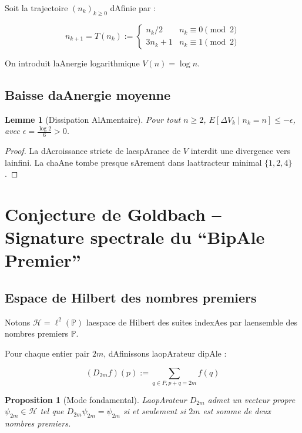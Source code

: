 ﻿\documentclass[12pt]{article}
\newtheorem{lemma}{Lemme}
\newtheorem{proposition}{Proposition}
\begin{document}
Soit la trajectoire $(n_k)_{k\ge 0}$ dAfinie par :

$$n_{k+1} = T(n_k) := \begin{cases} n_k/2 & n_k \equiv 0 \pmod 2 \\ 3n_k+1 & n_k \equiv 1 \pmod 2 \end{cases}$$



On introduit laAnergie logarithmique $V(n) = \log n$.



\subsection{Baisse daAnergie moyenne} 

\begin{lemma}[Dissipation AlAmentaire] 

Pour tout $n\ge 2$, $E[\Delta V_k \mid n_k = n] \le -\epsilon$, avec $\epsilon = \frac{\log 2}{6} > 0$.

\end{lemma}



\begin{proof}

La dAcroissance stricte de laespArance de $V$ interdit une divergence vers lainfini. La chaAne tombe presque sArement dans laattracteur minimal $\{1,2,4\}$.

\end{proof}



\section{Conjecture de Goldbach -- Signature spectrale du ``BipAle Premier''}



\subsection{Espace de Hilbert des nombres premiers} 

Notons $\mathcal H = \ell^2(\mathbb P)$ laespace de Hilbert des suites indexAes par laensemble des nombres premiers $\mathbb P$.

Pour chaque entier pair $2m$, dAfinissons laopArateur dipAle :

$$(D_{2m}f)(p) := \sum_{q \in P, p+q=2m} f(q)$$



\begin{proposition}[Mode fondamental] 

LaopArateur $D_{2m}$ admet un vecteur propre $\psi_{2m} \in \mathcal H$ tel que $D_{2m}\psi_{2m} = \psi_{2m}$ si et seulement si $2m$ est somme de deux nombres premiers.

\end{proposition}
\end{document}
